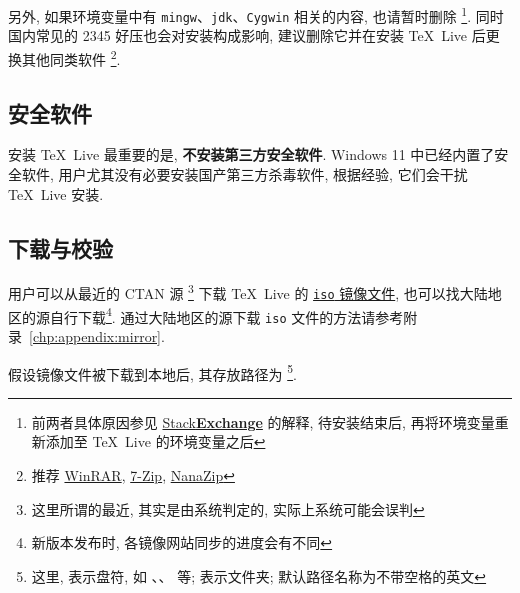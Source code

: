 另外, 如果环境变量中有 \texttt{mingw}、\texttt{jdk}、\texttt{Cygwin} 相关的内容,
也请暂时删除%
\footnote{前两者具体原因参见
\href{https://tex.stackexchange.com/questions/445086/error-installing-latest-version-of-tex-live-on-windows-10}{\textsf{Stack\textbf{Exchange}}}
的解释, 待安装结束后, 再将环境变量重新添加至 \TeX~Live 的环境变量之后}.
同时国内常见的 2345 好压也会对安装构成影响,
建议删除它并在安装 \TeX~Live 后更换其他同类软件%
\footnote{推荐 \href{http://www.winrar.com.cn/}{WinRAR},
\href{https://www.7-zip.org/}{7-Zip},
\href{https://www.nanazip.com.cn/}{NanaZip}}.

\subsection{安全软件}

安装 \TeX~Live 最重要的是,
\textbf{不安装第三方安全软件}.
Windows 11 中已经内置了安全软件,
用户尤其没有必要安装国产第三方杀毒软件,
根据经验,
它们会干扰 \TeX~Live 安装.

\subsection{下载与校验}\label{sec:windows:download}

用户可以从最近的 CTAN 源%
\footnote{这里所谓的最近, 其实是由系统判定的, 实际上系统可能会误判}%
下载 \TeX~Live 的
\href{https://mirrors.ctan.org/systems/texlive/Images/texlive2026.iso}{\texttt{iso} 镜像文件},
也可以找大陆地区的源自行下载\footnote{新版本发布时, 各镜像网站同步的进度会有不同}.
通过大陆地区的源下载 \texttt{iso} 文件的方法请参考附录~\ref{chp:appendix:mirror}.

假设镜像文件被下载到本地后,
其存放路径为 %
\footnote{这里,  表示盘符,
如 、、 等;
 表示文件夹;
默认路径名称为不带空格的英文}.

